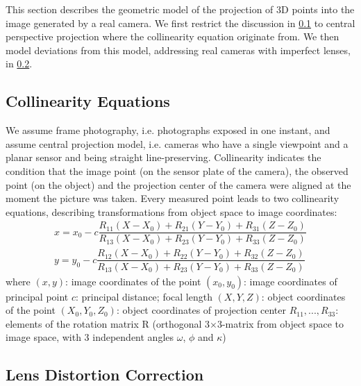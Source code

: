 This section describes the geometric model of the projection of 3D points into the image generated by a real camera. We first restrict the discussion in \cref{subsec:Collinearity} to central perspective projection where the collinearity equation originate from. We then model deviations from this model, addressing real cameras with imperfect lenses, in \cref{subsec:LensDistortion}.

\subsection{Collinearity Equations}
\label{subsec:Collinearity}
We assume frame photography, i.e. photographs exposed in one instant, and assume central projection model, i.e. cameras who have a single viewpoint and a planar sensor and being straight line-preserving. Collinearity indicates the condition that the image point (on the sensor plate of the camera), the observed point (on the object) and the projection center of the camera were aligned at the moment the picture was taken. Every measured point leads to two collinearity equations, describing transformations from object space to image coordinates:
\begin{equation} \label{eq:collinearity}
\begin{split}
x = x_0 -c \dfrac {R_{11}(X-X_0) + R_{21}(Y-Y_0) + R_{31}(Z-Z_0)} {R_{13}(X-X_0) + R_{23}(Y-Y_0) + R_{33}(Z-Z_0)} \\
y = y_0 -c \dfrac {R_{12}(X-X_0) + R_{22}(Y-Y_0) + R_{32}(Z-Z_0)} {R_{13}(X-X_0) + R_{23}(Y-Y_0) + R_{33}(Z-Z_0)}
\end{split}
\end{equation}
where\newline
$(x, y)$: image coordinates of the point \newline
$(x_0, y_0)$: image coordinates of principal point \newline
$c$: principal distance; focal length \newline
$(X, Y, Z)$: object coordinates of the point \newline
$(X_0, Y_0, Z_0)$: object coordinates of projection center \newline
$R_{11},...,R_{33}$: elements of the rotation matrix R (orthogonal 3$\times$3-matrix from object space to image space, with 3 independent angles $\omega$, $\phi$ and $\kappa$)

\subsection{Lens Distortion Correction}
\label{subsec:LensDistortion}

